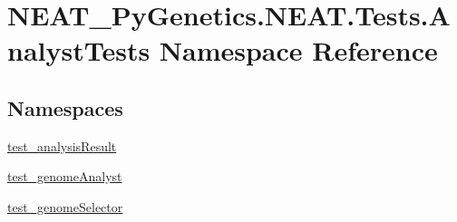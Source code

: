 \hypertarget{namespaceNEAT__PyGenetics_1_1NEAT_1_1Tests_1_1AnalystTests}{}\section{N\+E\+A\+T\+\_\+\+Py\+Genetics.\+N\+E\+A\+T.\+Tests.\+Analyst\+Tests Namespace Reference}
\label{namespaceNEAT__PyGenetics_1_1NEAT_1_1Tests_1_1AnalystTests}
\subsection*{Namespaces}
\begin{DoxyCompactItemize}
\item 
 \hyperlink{namespaceNEAT__PyGenetics_1_1NEAT_1_1Tests_1_1AnalystTests_1_1test__analysisResult}{test\+\_\+analysis\+Result}
\item 
 \hyperlink{namespaceNEAT__PyGenetics_1_1NEAT_1_1Tests_1_1AnalystTests_1_1test__genomeAnalyst}{test\+\_\+genome\+Analyst}
\item 
 \hyperlink{namespaceNEAT__PyGenetics_1_1NEAT_1_1Tests_1_1AnalystTests_1_1test__genomeSelector}{test\+\_\+genome\+Selector}
\end{DoxyCompactItemize}
